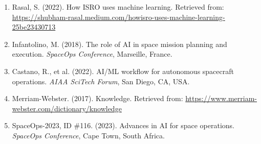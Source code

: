 \documentclass[a4paper, 11pt]{article}
\begin{document}
\begin{enumerate}
    \item Rasal, S. (2022). How ISRO uses machine learning. Retrieved from: \url{https://shubham-rasal.medium.com/howisro-uses-machine-learning-25be23430713}
    
    \item Infantolino, M. (2018). The role of AI in space mission planning and execution. \textit{SpaceOps Conference}, Marseille, France.
    
    \item Castano, R., et al. (2022). AI/ML workflow for autonomous spacecraft operations. \textit{AIAA SciTech Forum}, San Diego, CA, USA.
    
    \item Merriam-Webster. (2017). Knowledge. Retrieved from: \url{https://www.merriam-webster.com/dictionary/knowledge}
    
    \item SpaceOps-2023, ID \#116. (2023). Advances in AI for space operations. \textit{SpaceOps Conference}, Cape Town, South Africa.
\end{enumerate}
\end{document}
